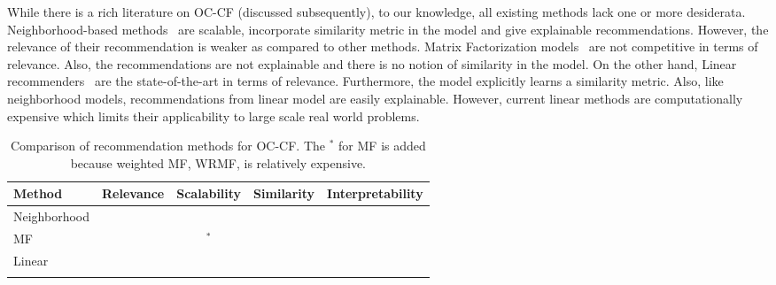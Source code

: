 While there is a rich literature on OC-CF (discussed subsequently),
to our knowledge, all existing methods lack one
or more desiderata. 
Neighborhood-based methods~\citep{Sarwar:2001, Linden:2003} are scalable, incorporate similarity metric in the model and give explainable recommendations. 
However, the relevance of their recommendation is weaker as compared to other methods. 
Matrix Factorization models~\citep{Hu:2008} are %
not competitive in terms of relevance. Also, the recommendations are not explainable and there is no notion of similarity in the model. On the other hand, Linear recommenders~\cite{Ning:2011, Sedhain:2016} are the state-of-the-art in terms of relevance. Furthermore, the model explicitly learns a similarity metric. Also, like neighborhood models, recommendations from linear model are easily explainable. However, current linear methods are computationally expensive which limits their applicability to large scale real world problems. 
\begin{table*}[!ht]
	\centering

		\begin{tabular}{llccc}
		\toprule
		\toprule	
		\textbf{Method} & \textbf{Relevance} & \textbf{Scalability} & \textbf{Similarity} & \textbf{Interpretability} \\
		\toprule
		Neighborhood & \cross & \tick & \tick & \tick \\
		MF & \cross & \tick$^*$  & \cross & \cross \\
		Linear & \tick & \cross & \tick & \tick \\
		\LinearLow & \tick & \tick & \tick & \tick \\
		\bottomrule
		\end{tabular}
	\caption{Comparison of recommendation methods for OC-CF. The $^*$ for MF is added because weighted MF, WRMF, is relatively expensive.}
	\label{tbl:comparison}
\end{table*}

